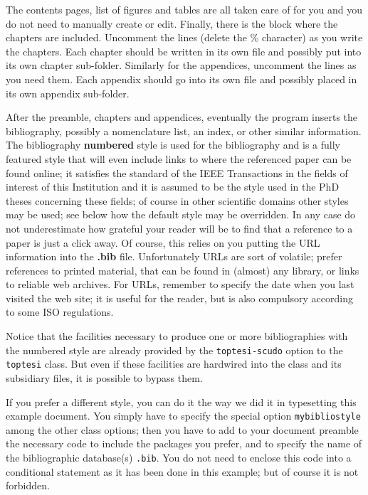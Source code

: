 The contents pages, list of figures and tables are all taken care of for you and you do not need to manually create or edit.  Finally, there is the block where the chapters are included. Uncomment the lines (delete the \% character) as you write the chapters. Each chapter should be written in its own file and possibly put into its own chapter sub-folder. Similarly for the appendices, uncomment the lines as you need them. Each appendix should go into its own file and possibly placed in its own appendix sub-folder.

After the preamble, chapters and appendices, eventually the program inserts the bibliography, possibly a nomenclature list, an index, or other similar information. The bibliography \textbf{numbered} style is used for the bibliography and is a fully featured style that will even include links to where the referenced paper can be found online; it satisfies the standard of the IEEE Transactions in the fields of interest of this Institution and it is assumed to be the style used in the PhD theses concerning these fields; of course in other scientific domains other styles may be used; see below how the default style may be overridden. 
In any case do not underestimate how grateful your reader will be to find that a reference to a paper is just a click away. Of course, this relies on you putting the URL information into the \textbf{.bib} file. Unfortunately URLs are sort of volatile; prefer references to printed material, that can be found in (almost) any library, or links to reliable web archives. For URLs, remember to specify the date when you last visited the web site; it is useful for the reader, but is also compulsory according to some ISO regulations.

Notice that the facilities necessary to produce one or more bibliographies with the numbered style are already provided by the \texttt{toptesi-scudo} option to the \texttt{toptesi} class. But even if these facilities are  hardwired into the class and its subsidiary files, it is possible to bypass them. 

If you prefer a different style, you can do it the way we did it in typesetting this example document. You simply have to specify the special option \texttt{mybibliostyle} among the other class options; then you have to add to your document preamble the necessary code to include the packages you prefer, and to specify the name of the bibliographic database(s) \texttt{.bib}. You do not need to enclose this code into a conditional statement as it has been done in this example; but of course it is not forbidden.

